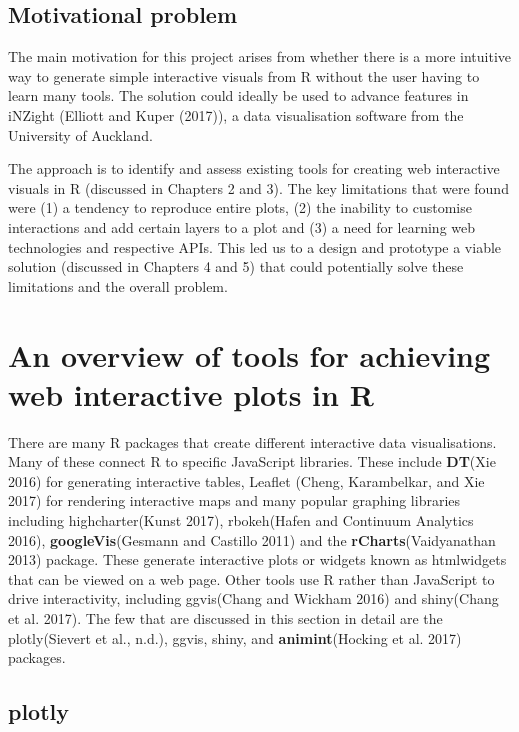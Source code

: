 \documentclass[11pt,]{report}
\begin{document}
\section{Motivational problem}\label{motivational-problem}

The main motivation for this project arises from whether there is a more
intuitive way to generate simple interactive visuals from R without the
user having to learn many tools. The solution could ideally be used to
advance features in iNZight (Elliott and Kuper (2017)), a data
visualisation software from the University of Auckland.

The approach is to identify and assess existing tools for creating web
interactive visuals in R (discussed in Chapters 2 and 3). The key
limitations that were found were (1) a tendency to reproduce entire
plots, (2) the inability to customise interactions and add certain
layers to a plot and (3) a need for learning web technologies and
respective APIs. This led us to a design and prototype a viable solution
(discussed in Chapters 4 and 5) that could potentially solve these
limitations and the overall problem.

\newpage

\chapter{An overview of tools for achieving web interactive plots in
R}\label{an-overview-of-tools-for-achieving-web-interactive-plots-in-r}

There are many R packages that create different interactive data
visualisations. Many of these connect R to specific JavaScript
libraries. These include \textbf{DT}(Xie 2016) for generating
interactive tables, \textsf{Leaflet} (Cheng, Karambelkar, and Xie 2017)
for rendering interactive maps and many popular graphing libraries
including \textsf{highcharter}(Kunst 2017), \textsf{rbokeh}(Hafen and
Continuum Analytics 2016), \textbf{googleVis}(Gesmann and Castillo 2011)
and the \textbf{rCharts}(Vaidyanathan 2013) package. These generate
interactive plots or widgets known as htmlwidgets that can be viewed on
a web page. Other tools use R rather than JavaScript to drive
interactivity, including \textsf{ggvis}(Chang and Wickham 2016) and
\textsf{shiny}(Chang et al. 2017). The few that are discussed in this
section in detail are the \textsf{plotly}(Sievert et al., n.d.),
\textsf{ggvis}, \textsf{shiny}, and \textbf{animint}(Hocking et al.
2017) packages.

\section{plotly}\label{plotly}
\end{document}
